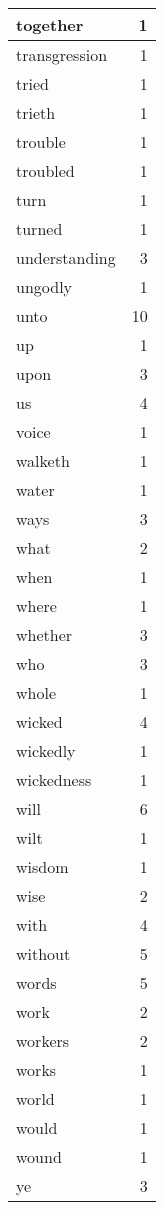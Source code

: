 \begin{center}
\begin{longtable}{l|r}
together & 1 \\ \hline
transgression & 1 \\ \hline
tried & 1 \\ \hline
trieth & 1 \\ \hline
trouble & 1 \\ \hline
troubled & 1 \\ \hline
turn & 1 \\ \hline
turned & 1 \\ \hline
understanding & 3 \\ \hline
ungodly & 1 \\ \hline
unto & 10 \\ \hline
up & 1 \\ \hline
upon & 3 \\ \hline
us & 4 \\ \hline
voice & 1 \\ \hline
walketh & 1 \\ \hline
water & 1 \\ \hline
ways & 3 \\ \hline
what & 2 \\ \hline
when & 1 \\ \hline
where & 1 \\ \hline
whether & 3 \\ \hline
who & 3 \\ \hline
whole & 1 \\ \hline
wicked & 4 \\ \hline
wickedly & 1 \\ \hline
wickedness & 1 \\ \hline
will & 6 \\ \hline
wilt & 1 \\ \hline
wisdom & 1 \\ \hline
wise & 2 \\ \hline
with & 4 \\ \hline
without & 5 \\ \hline
words & 5 \\ \hline
work & 2 \\ \hline
workers & 2 \\ \hline
works & 1 \\ \hline
world & 1 \\ \hline
would & 1 \\ \hline
wound & 1 \\ \hline
ye & 3 \\ \hline
\end{longtable}
\end{center}



